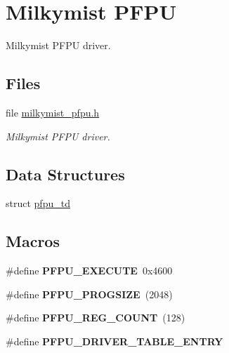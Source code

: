 \hypertarget{group__lm32__milkymist__pfpu}{}\section{Milkymist P\+F\+PU}
\label{group__lm32__milkymist__pfpu}


Milkymist P\+F\+PU driver.  


\subsection*{Files}
\begin{DoxyCompactItemize}
\item 
file \mbox{\hyperlink{milkymist__pfpu_8h}{milkymist\+\_\+pfpu.\+h}}
\begin{DoxyCompactList}\small\item\em Milkymist P\+F\+PU driver. \end{DoxyCompactList}\end{DoxyCompactItemize}
\subsection*{Data Structures}
\begin{DoxyCompactItemize}
\item 
struct \mbox{\hyperlink{structpfpu__td}{pfpu\+\_\+td}}
\end{DoxyCompactItemize}
\subsection*{Macros}
\begin{DoxyCompactItemize}
\item 
\mbox{\label{group__lm32__milkymist__pfpu_ga889a00e31d9f62692063fb52ae4d5e30}} 
\#define {\bfseries P\+F\+P\+U\+\_\+\+E\+X\+E\+C\+U\+TE}~0x4600
\item 
\mbox{\label{group__lm32__milkymist__pfpu_ga00ad93ecbbf2b8ad9b04c03e2c90c23e}} 
\#define {\bfseries P\+F\+P\+U\+\_\+\+P\+R\+O\+G\+S\+I\+ZE}~(2048)
\item 
\mbox{\label{group__lm32__milkymist__pfpu_ga01aae0853421c9fdc1b40a77c04369c7}} 
\#define {\bfseries P\+F\+P\+U\+\_\+\+R\+E\+G\+\_\+\+C\+O\+U\+NT}~(128)
\item 
\#define {\bfseries P\+F\+P\+U\+\_\+\+D\+R\+I\+V\+E\+R\+\_\+\+T\+A\+B\+L\+E\+\_\+\+E\+N\+T\+RY}
\end{DoxyCompactItemize}
